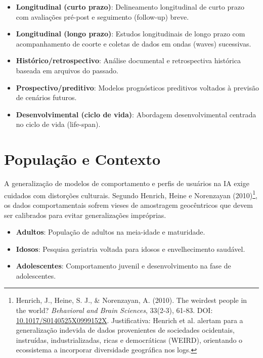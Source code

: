 \documentclass[12pt,a4paper,oneside]{abntex2}
\begin{document}
\begin{apendicesenv}
\begin{itemize}
    \item \textbf{Longitudinal (curto prazo)}: Delineamento longitudinal de curto prazo com avaliações pré-post e seguimento (follow-up) breve.

    \item \textbf{Longitudinal (longo prazo)}: Estudos longitudinais de longo prazo com acompanhamento de coorte e coletas de dados em ondas (waves) sucessivas.

    \item \textbf{Histórico/retrospectivo}: Análise documental e retrospectiva histórica baseada em arquivos do passado.

    \item \textbf{Prospectivo/preditivo}: Modelos prognósticos preditivos voltados à previsão de cenários futuros.

    \item \textbf{Desenvolvimental (ciclo de vida)}: Abordagem desenvolvimental centrada no ciclo de vida (life-span).
\end{itemize}

\section{População e Contexto}

A generalização de modelos de comportamento e perfis de usuários na IA exige cuidados com distorções culturais. Segundo Henrich, Heine e Norenzayan (2010)\footnote{Henrich, J., Heine, S. J., \& Norenzayan, A. (2010). The weirdest people in the world? \textit{Behavioral and Brain Sciences}, 33(2-3), 61-83. DOI: \href{https://doi.org/10.1017/S0140525X0999152X}{10.1017/S0140525X0999152X}. Justificativa: Henrich et al. alertam para a generalização indevida de dados provenientes de sociedades ocidentais, instruídas, industrializadas, ricas e democráticas (WEIRD), orientando o ecossistema a incorporar diversidade geográfica nos logs.}, os dados comportamentais sofrem vieses de amostragem geocêntricos que devem ser calibrados para evitar generalizações impróprias.

\begin{itemize}
    \item \textbf{Adultos}: População de adultos na meia-idade e maturidade.

    \item \textbf{Idosos}: Pesquisa geriatria voltada para idosos e envelhecimento saudável.

    \item \textbf{Adolescentes}: Comportamento juvenil e desenvolvimento na fase de adolescentes.


\end{itemize}
\end{apendicesenv}
\end{document}
